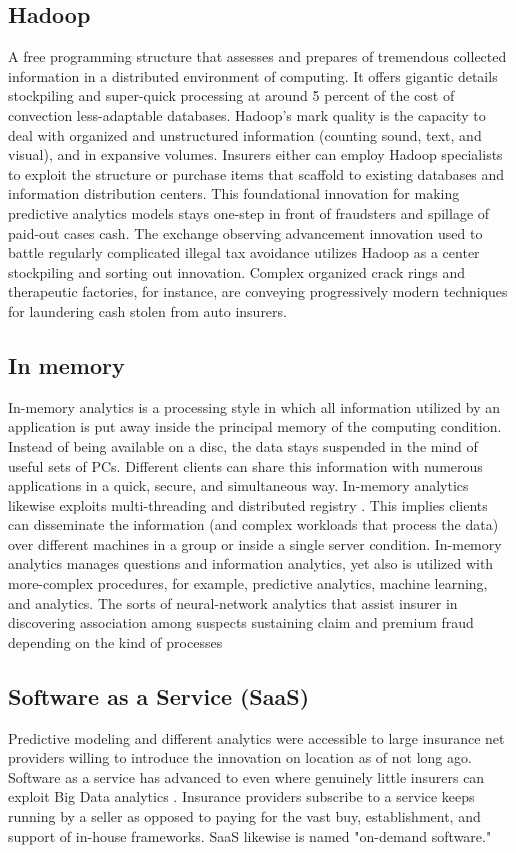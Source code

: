 \documentclass[sigconf]{acmart}
\begin{document}
\subsection{Hadoop}
A free programming structure that assesses and prepares of tremendous collected information in a distributed environment of computing. It offers gigantic details stockpiling and super-quick processing at around 5 percent of the cost of convection less-adaptable databases. Hadoop's mark quality is the capacity to deal with organized and unstructured information (counting sound, text, and visual), and in expansive volumes. Insurers either can employ Hadoop specialists to exploit the structure or purchase items that scaffold to existing databases and information distribution centers\cite{2,3}. This foundational innovation for making predictive analytics models stays one-step in front of fraudsters and spillage of paid-out cases cash. The exchange observing advancement innovation used to battle regularly complicated illegal tax avoidance utilizes Hadoop as a center stockpiling and sorting out innovation. Complex organized crack rings and therapeutic factories, for instance, are conveying progressively modern techniques for laundering cash stolen from auto insurers.

\subsection{In memory}
In-memory analytics is a processing style in which all information utilized by an application is put away inside the principal memory of the computing condition. Instead of being available on a disc, the data stays suspended in the mind of useful sets of PCs. Different clients can share this information with numerous applications in a quick, secure, and simultaneous way. In-memory analytics likewise exploits multi-threading and distributed registry \cite{1,2}. This implies clients can disseminate the information (and complex workloads that process the data) over different machines in a group or inside a single server condition. In-memory analytics manages questions and information analytics, yet also is utilized with more-complex procedures, for example, predictive analytics, machine learning, and analytics. The sorts of neural-network analytics that assist insurer in discovering association among suspects sustaining claim and premium fraud depending on the kind of processes

\subsection{Software as a Service (SaaS)}
Predictive modeling and different analytics were accessible to large insurance net providers willing to introduce the innovation on location as of not long ago. Software as a service has advanced to even where genuinely little insurers can exploit Big Data analytics \cite{2}. Insurance providers subscribe to a service keeps running by a seller as opposed to paying for the vast buy, establishment, and support of in-house frameworks. SaaS likewise is named "on-demand software."
\end{document}
